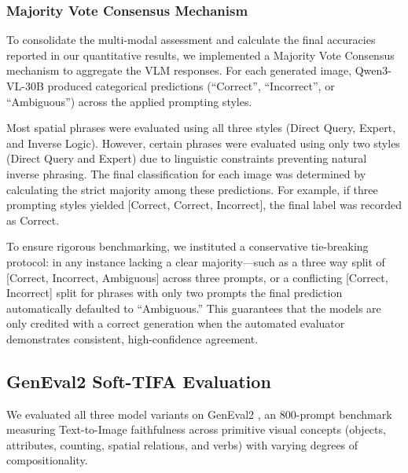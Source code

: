 
\subsubsection{Majority Vote Consensus Mechanism}
To consolidate the multi-modal assessment and calculate the final accuracies reported in our quantitative results, we implemented a Majority Vote Consensus mechanism to aggregate the VLM responses. For each generated image, Qwen3-VL-30B produced categorical predictions (``Correct'', ``Incorrect'', or ``Ambiguous'') across the applied prompting styles. 

Most spatial phrases were evaluated using all three styles (Direct Query, Expert, and Inverse Logic). However, certain phrases were evaluated using only two styles (Direct Query and Expert) due to linguistic constraints preventing natural inverse phrasing. The final classification for each image was determined by calculating the strict majority among these predictions. For example, if three prompting styles yielded [Correct, Correct, Incorrect], the final label was recorded as Correct. 

To ensure rigorous benchmarking, we instituted a conservative tie-breaking protocol: in any instance lacking a clear majority—such as a three way split of [Correct, Incorrect, Ambiguous] across three prompts, or a conflicting [Correct, Incorrect] split for phrases with only two prompts the final prediction automatically defaulted to ``Ambiguous.'' This guarantees that the models are only credited with a correct generation when the automated evaluator demonstrates consistent, high-confidence agreement.


\subsection{GenEval2 Soft-TIFA Evaluation}
We evaluated all three model variants on GenEval2 \citep{kamath2025geneval}, an 800-prompt benchmark measuring Text-to-Image faithfulness across primitive visual concepts (objects, attributes, counting, spatial relations, and verbs) with varying degrees of compositionality.

